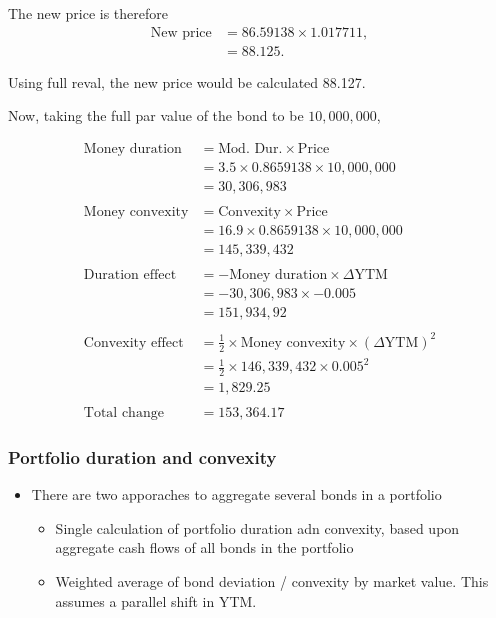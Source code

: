 \documentclass[../notes_compiled.tex]{subfiles}
\begin{document}
\begin{itemize}
{The new price is therefore
\begin{align*}
\text{New price} &= 86.59138 \times 1.017711, \\
&=88.125.
\end{align*}

Using full reval, the new price would be calculated 88.127.
}

{\color{RedViolet}
Now, taking the full par value of the bond to be $10,000,000$,
}

{\color{RoyalBlue}
\begin{align*}
\text{Money duration} &= \text{Mod. Dur.} \times \text{Price} \\
&= 3.5 \times 0.8659138 \times 10,000,000 \\
& = 30,306,983 \\ \\
\text{Money convexity} & = \text{Convexity} \times \text{Price} \\
&=16.9 \times 0.8659138 \times 10,000,000 \\
&=145,339,432 \\ \\
\text{Duration effect} &= -\text{Money duration} \times \Delta\text{YTM} \\
&= -30,306,983 \times -0.005 \\
&= 151,934,92 \\ \\
\text{Convexity effect} &= \frac{1}{2} \times \text{Money convexity} \times (\Delta\text{YTM})^{2} \\
&= \frac{1}{2} \times 146,339,432 \times 0.005^{2} \\
&=1,829.25 \\ \\
\text{Total change} &= 153,364.17
\end{align*}
}
\end{itemize}

\subsubsection{Portfolio duration and convexity}
\begin{itemize}
\item There are two apporaches to aggregate several bonds in a portfolio
\begin{itemize}
\item Single calculation of portfolio duration adn convexity, based upon aggregate cash flows of all bonds in the portfolio
\item Weighted average of bond deviation / convexity by market value. This assumes a parallel shift in YTM.
\end{itemize}
\end{itemize}
\end{document}
